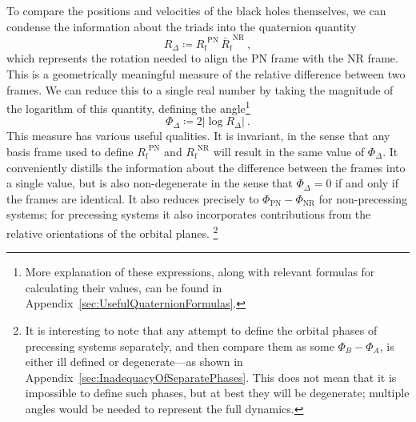 \documentclass[aps,prd,amsmath,floatfix,twocolumn,superscriptaddress,nofootinbib,showpacs]{revtex4-1}
\newcommand{\Rf}[1][]{\ensuremath{R_{\text{f#1}}}}
\newcommand{\Rbarf}[1][]{\ensuremath{\bar{R}_{\text{f#1}}}}
\newcommand{\RfPN}{\Rf^{\text{PN}}}
\newcommand{\RfNR}{\Rf^{\text{NR}}}
\newcommand{\RbarfNR}{\Rbarf^{\text{NR}}}
\newcommand{\defined}{\coloneqq}
\begin{document}
To compare the positions and velocities of the black holes themselves,
we can condense the information about the triads into the quaternion
quantity~\cite{Boyle:2013}
\begin{equation}
  R_{\Delta} \defined \RfPN\, \RbarfNR~,
\end{equation}
which represents the rotation needed to align the PN frame with the NR
frame.  This is a geometrically meaningful measure of the relative
difference between two frames.  We can reduce this to a single real
number by taking the magnitude of the logarithm of this quantity,
defining the angle\footnote{More explanation of these expressions,
  along with relevant formulas for calculating their values, can be
  found in Appendix~\ref{sec:UsefulQuaternionFormulas}.}
\begin{equation}
  \label{eq:PhaseDifference}
  \Phi_{\Delta} \defined 2 \left\lvert \log R_{\Delta} \right\rvert~.
\end{equation}
This measure has various useful qualities.  It is invariant, in
  the sense that any basis frame used to define $\RfPN$ and $\RfNR$
  will result in the same value of $\Phi_{\Delta}$.  It conveniently
  distills the information about the difference between the frames
  into a single value, but is also non-degenerate in the sense that
  $\Phi_{\Delta} = 0$ if and only if the frames are identical.  It
  also reduces precisely to $\Phi_{\text{PN}} - \Phi_{\text{NR}}$ for
  non-precessing systems; for precessing systems it also incorporates
  contributions from the relative orientations of the orbital
  planes.%
\footnote{It is interesting to note that any attempt to define
  the orbital phases of precessing systems separately, and then
  compare them as some $\Phi_{B} - \Phi_{A}$, is either ill defined or
  degenerate---as shown in
  Appendix~\ref{sec:InadequacyOfSeparatePhases}.  This does not
    mean that it is impossible to define such phases, but at best they
    will be degenerate; multiple angles would be needed to represent
    the full dynamics.}
\end{document}

